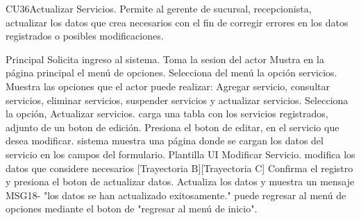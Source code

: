 



	\begin{UseCase}{CU36}{Actualizar Servicios.}{
		Permite al gerente de sucursal, recepcionista, actualizar los datos que crea necesarios con el fin de corregir errores en los datos registrados o posibles modificaciones.
	}


	\end{UseCase}

	\begin{UCtrayectoria}{Principal}
		\UCpaso Solicita ingreso al sistema.
		\UCpaso Toma la sesion del actor
		\UCpaso Mustra en la página principal el menú de opciones.
		\UCpaso[\UCactor] Selecciona del menú la opción servicios.
		\UCpaso Muestra las opciones que el actor puede realizar: Agregar servicio, consultar servicios, eliminar servicios, suspender servicios y actualizar servicios.
		\UCpaso[\UCactor] Selecciona la opción, Actualizar servicios. 
		\UCpaso carga una tabla con los servicios registrados, adjunto de un boton de edición.
		\UCpaso[\UCactor] Presiona el boton de editar, en el servicio que desea modificar.
		\UCpaso sistema muestra una página donde se cargan los datos del servicio en los campos del formulario. Plantilla UI Modificar Servicio.
		\UCpaso[\UCactor] modifica los datos que considere necesarios [Trayectoria B][Trayectoria C]
		\UCpaso[\UCactor] Confirma el registro y presiona el boton de actualizar datos.
		\UCpaso Actualiza los datos y muestra un mensaje MSG18- "los datos se han actualizado exitosamente."
		\UCpaso[\UCactor] puede regresar al menú de opciones mediante el boton de "regresar al menú de inicio".
	\end{UCtrayectoria}

